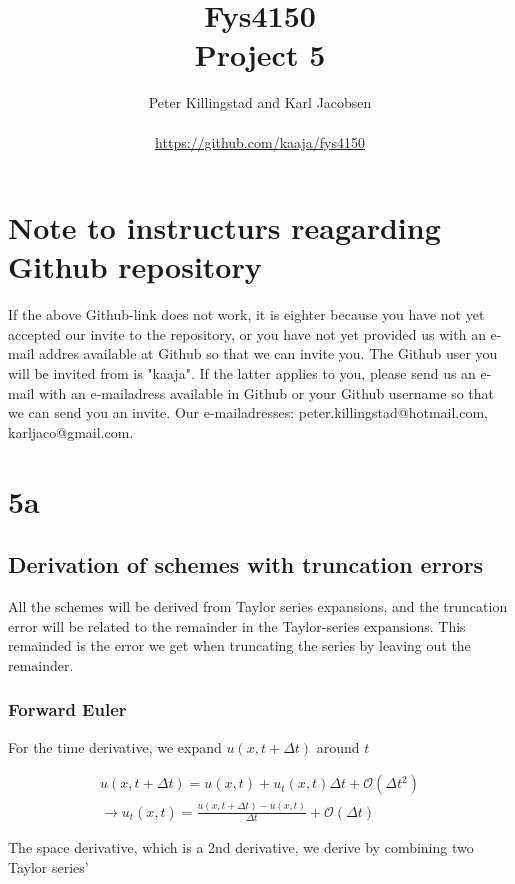 \documentclass{article}
\title{Fys4150\\Project 5\\ }
\author{Peter Killingstad and Karl Jacobsen\\
\\
\url{https://github.com/kaaja/fys4150}}
\begin{document}
	
\maketitle

\section*{Note to instructurs reagarding Github repository}
If the above Github-link does not work, it is eighter because you have not yet accepted our invite to the repository, or you have not yet provided us with an e-mail addres available at Github so that we can invite you. The Github user you will be invited from is "kaaja". If the latter applies to you, please send us an e-mail with an e-mailadress available in Github or your Github username so that we can send you an invite. Our e-mailadresses: peter.killingstad@hotmail.com, karljaco@gmail.com.

\section{5a}

\subsection{Derivation of schemes with truncation errors}
All the schemes will be derived from Taylor series expansions, and the truncation error will be related to the remainder in the Taylor-series expansions. This remainded is the error we get when truncating the series by leaving out the remainder.\\

\subsubsection{Forward Euler}
For the time derivative, we expand $u(x, t + \Delta t)$ around $t$

\begin{subequations}
	\begin{align}
		u(x, t+ \Delta t)  = u(x,t) +  u_t(x,t) \Delta t + \mathcal{O}(\Delta t^2)\\
		\rightarrow u_t(x,t) = \frac{u(x, t+ \Delta t) - u(x,t)}{\Delta t} + \mathcal{O}(\Delta t)\label{eq:FeTime}
	\end{align}
\end{subequations}

The space derivative, which is a 2nd derivative, we derive by combining two Taylor series'
\end{document}
